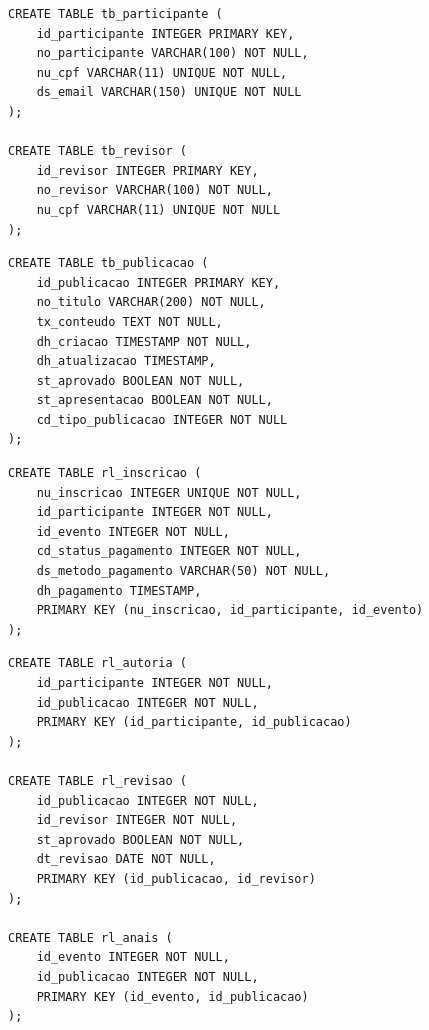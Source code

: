 \documentclass[12pt,a4paper]{article}
\begin{document}
\noindent\begin{minipage}{\linewidth}
\begin{lstlisting}[caption={DDL --- entidades \texttt{tb\_participante} e \texttt{tb\_revisor}.}, label={lst:ddl-pessoas}]
CREATE TABLE tb_participante (
    id_participante INTEGER PRIMARY KEY,
    no_participante VARCHAR(100) NOT NULL,
    nu_cpf VARCHAR(11) UNIQUE NOT NULL,
    ds_email VARCHAR(150) UNIQUE NOT NULL
);

CREATE TABLE tb_revisor (
    id_revisor INTEGER PRIMARY KEY,
    no_revisor VARCHAR(100) NOT NULL,
    nu_cpf VARCHAR(11) UNIQUE NOT NULL
);
\end{lstlisting}
\end{minipage}

\noindent\begin{minipage}{\linewidth}
\begin{lstlisting}[caption={DDL --- entidade \texttt{tb\_publicacao}.}, label={lst:ddl-publicacao}]
CREATE TABLE tb_publicacao (
    id_publicacao INTEGER PRIMARY KEY,
    no_titulo VARCHAR(200) NOT NULL,
    tx_conteudo TEXT NOT NULL,
    dh_criacao TIMESTAMP NOT NULL,
    dh_atualizacao TIMESTAMP,
    st_aprovado BOOLEAN NOT NULL,
    st_apresentacao BOOLEAN NOT NULL,
    cd_tipo_publicacao INTEGER NOT NULL
);
\end{lstlisting}
\end{minipage}

\noindent\begin{minipage}{\linewidth}
\begin{lstlisting}[caption={DDL --- relacionamento \texttt{rl\_inscricao}.}, label={lst:ddl-inscricao}]
CREATE TABLE rl_inscricao (
    nu_inscricao INTEGER UNIQUE NOT NULL,
    id_participante INTEGER NOT NULL,
    id_evento INTEGER NOT NULL,
    cd_status_pagamento INTEGER NOT NULL,
    ds_metodo_pagamento VARCHAR(50) NOT NULL,
    dh_pagamento TIMESTAMP,
    PRIMARY KEY (nu_inscricao, id_participante, id_evento)
);
\end{lstlisting}
\end{minipage}

\noindent\begin{minipage}{\linewidth}
\begin{lstlisting}[caption={DDL --- relacionamentos \texttt{rl\_autoria}, \texttt{rl\_revisao} e \texttt{rl\_anais}.}, label={lst:ddl-relacionamentos}]
CREATE TABLE rl_autoria (
    id_participante INTEGER NOT NULL,
    id_publicacao INTEGER NOT NULL,
    PRIMARY KEY (id_participante, id_publicacao)
);

CREATE TABLE rl_revisao (
    id_publicacao INTEGER NOT NULL,
    id_revisor INTEGER NOT NULL,
    st_aprovado BOOLEAN NOT NULL,
    dt_revisao DATE NOT NULL,
    PRIMARY KEY (id_publicacao, id_revisor)
);

CREATE TABLE rl_anais (
    id_evento INTEGER NOT NULL,
    id_publicacao INTEGER NOT NULL,
    PRIMARY KEY (id_evento, id_publicacao)
);
\end{lstlisting}
\end{minipage}
\end{document}
